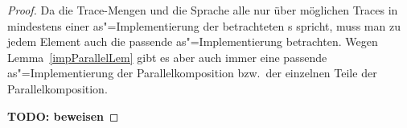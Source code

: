 \begin{proof}
  Da die Trace-Mengen und die Sprache alle nur über möglichen Traces in
  mindestens einer as"=Implementierung der betrachteten \MEIO{}s spricht, muss
  man zu jedem Element auch die passende as"=Implementierung betrachten. Wegen
  Lemma~\ref{impParallelLem} gibt es aber auch immer eine passende
  as"=Implementierung der Parallelkomposition bzw.\ der einzelnen Teile der
  Parallelkomposition.

  \textbf{TODO: beweisen}




\end{proof}
